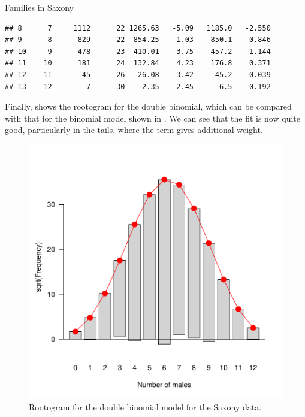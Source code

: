 \documentclass[11pt]{book}
\renewenvironment{knitrout}{\small\renewcommand{\baselinestretch}{.85}}{} %
\begin{document}
\begin{Example}[saxony2]{Families in Saxony}
\begin{knitrout}
\begin{kframe}
\begin{verbatim}
## 8      7     1112      22 1265.63   -5.09   1185.0   -2.550
## 9      8      829      22  854.25   -1.03    850.1   -0.846
## 10     9      478      23  410.01    3.75    457.2    1.144
## 11    10      181      24  132.84    4.23    176.8    0.371
## 12    11       45      26   26.08    3.42     45.2   -0.039
## 13    12        7      30    2.35    2.45      6.5    0.192
\end{verbatim}
\end{kframe}
\end{knitrout}
Finally,  shows the rootogram for the double
binomial, which can be compared with that for the binomial model
shown in .  We can see that the fit is now
quite good, particularly in the tails, where the term 
gives additional weight.
\begin{knitrout}
\color{fgcolor}\begin{kframe}
\begin{alltt}
  
                        \hlstd{=}\hlstd{))}
\end{alltt}
\end{kframe}\begin{figure}[!htbp]


\centerline{\includegraphics[width=.6\textwidth]{ch03/fig/sax-glm5} }

\caption[Rootogram for the double binomial model for the Saxony data]{Rootogram for the double binomial model for the Saxony data.\label{fig:sax-glm5}}
\end{figure}


\end{knitrout}



\end{Example}
\end{document}

